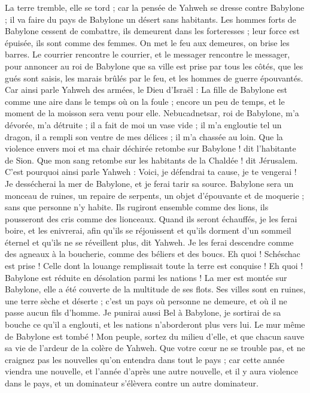 \begin{multicols}{2}
La terre tremble, elle se tord ; car la pensée de Yahweh se dresse contre Babylone ; il va faire du pays de Babylone un désert sans habitants.
Les hommes forts de Babylone cessent de combattre, ils demeurent dans les forteresses ; leur force est épuisée, ils sont comme des femmes. On met le feu aux demeures, on brise les barres.
Le courrier rencontre le courrier, et le messager rencontre le messager, pour annoncer au roi de Babylone que sa ville est prise par tous les côtés,
que les gués sont saisis, les marais brûlés par le feu, et les hommes de guerre épouvantés.
Car ainsi parle Yahweh des armées, le Dieu d'Israël : La fille de Babylone est comme une aire dans le temps où on la foule ; encore un peu de temps, et le moment de la moisson sera venu pour elle.
Nebucadnetsar, roi de Babylone, m'a dévorée, m'a détruite ; il a fait de moi un vase vide ; il m'a engloutie tel un dragon, il a rempli son ventre de mes délices ; il m'a chassée au loin.
Que la violence envers moi et ma chair déchirée retombe sur Babylone ! dit l'habitante de Sion. Que mon sang retombe sur les habitants de la Chaldée ! dit Jérusalem.
C'est pourquoi ainsi parle Yahweh : Voici, je défendrai ta cause, je te vengerai ! Je dessécherai la mer de Babylone, et je ferai tarir sa source.
Babylone sera un monceau de ruines, un repaire de serpents, un objet d'épouvante et de moquerie ; sans que personne n'y habite.
Ils rugiront ensemble comme des lions, ils pousseront des cris comme des lionceaux.
Quand ils seront échauffés, je les ferai boire, et les enivrerai, afin qu'ils se réjouissent et qu'ils dorment d'un sommeil éternel et qu'ils ne se réveillent plus, dit Yahweh.
Je les ferai descendre comme des agneaux à la boucherie, comme des béliers et des boucs.
Eh quoi ! Schéschac est prise ! Celle dont la louange remplissait toute la terre est conquise ! Eh quoi ! Babylone est réduite en désolation parmi les nations !
La mer est montée sur Babylone, elle a été couverte de la multitude de ses flots.
Ses villes sont en ruines, une terre sèche et déserte ; c'est un pays où personne ne demeure, et où il ne passe aucun fils d'homme.
Je punirai aussi Bel à Babylone, je sortirai de sa bouche ce qu'il a englouti, et les nations n'aborderont plus vers lui. Le mur même de Babylone est tombé !
Mon peuple, sortez du milieu d'elle, et que chacun sauve sa vie de l'ardeur de la colère de Yahweh.
Que votre cœur ne se trouble pas, et ne craignez pas les nouvelles qu'on entendra dans tout le pays ; car cette année viendra une nouvelle, et l'année d'après une autre nouvelle, et il y aura violence dans le pays, et un dominateur s'élèvera contre un autre dominateur.

\end{multicols}
